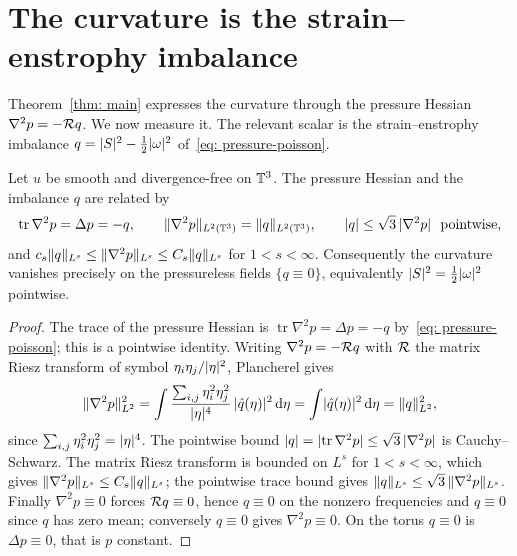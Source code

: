 \section{The curvature is the strain--enstrophy imbalance}
\label{sec: imbalance}

Theorem~\ref{thm: main} expresses the curvature through the pressure Hessian
$\nabla^2 p = -\mathcal{R} q$. We now measure it. The relevant scalar is the
strain--enstrophy imbalance $q = \lvert S \rvert^2 - \tfrac12\lvert \omega \rvert^2$
of~\eqref{eq: pressure-poisson}.

\begin{theorem}\label{thm: imbalance}
Let $u$ be smooth and divergence-free on
$\mathbb{T}^3$. The pressure Hessian and the imbalance $q$ are related by
\begin{equation}\label{eq: imbalance}
  \operatorname{tr}\nabla^2 p = \Delta p = -q,
  \qquad
  \lVert \nabla^2 p \rVert_{L^2(\mathbb{T}^3)} = \lVert q \rVert_{L^2(\mathbb{T}^3)},
  \qquad
  \lvert q \rvert \le \sqrt{3}\,\lvert \nabla^2 p \rvert\ \text{ pointwise},
\end{equation}
and $c_s\lVert q \rVert_{L^s} \le \lVert \nabla^2 p \rVert_{L^s} \le C_s\lVert q \rVert_{L^s}$ for
$1 < s < \infty$. Consequently the curvature vanishes precisely on the
pressureless fields $\{q \equiv 0\}$, equivalently
$\lvert S \rvert^2 = \tfrac12\lvert \omega \rvert^2$ pointwise.
\end{theorem}

\begin{proof}
The trace of the pressure Hessian is $\operatorname{tr}\nabla^2 p = \Delta p =
-q$ by~\eqref{eq: pressure-poisson}; this is a pointwise identity. Writing
$\nabla^2 p = -\mathcal{R} q$ with $\mathcal{R}$ the matrix Riesz transform of symbol
$\eta_i\eta_j/\lvert \eta \rvert^2$, Plancherel gives
\[
  \lVert \nabla^2 p \rVert_{L^2}^2
  = \int \frac{\sum_{i,j}\eta_i^2\eta_j^2}{\lvert \eta \rvert^4}\,\lvert \hat q(\eta) \rvert^2\,\mathrm{d}\eta
  = \int \lvert \hat q(\eta) \rvert^2\,\mathrm{d}\eta
  = \lVert q \rVert_{L^2}^2,
\]
since $\sum_{i,j}\eta_i^2\eta_j^2 = \lvert \eta \rvert^4$. The pointwise bound
$\lvert q \rvert = \lvert \operatorname{tr}\nabla^2 p \rvert \le \sqrt{3}\,\lvert \nabla^2 p \rvert$ is
Cauchy--Schwarz. The matrix Riesz transform is bounded on $L^s$ for
$1 < s < \infty$, which gives $\lVert \nabla^2 p \rVert_{L^s} \le C_s\lVert q \rVert_{L^s}$;
the pointwise trace bound gives $\lVert q \rVert_{L^s} \le \sqrt{3}\,\lVert \nabla^2 p \rVert_{L^s}$.
Finally $\nabla^2 p \equiv 0$ forces $\mathcal{R} q \equiv 0$, hence
$\hat q \equiv 0$ on the nonzero frequencies and $q \equiv 0$ since $q$ has zero
mean; conversely $q \equiv 0$ gives $\nabla^2 p \equiv 0$. On the torus
$q \equiv 0$ is $\Delta p \equiv 0$, that is $p$ constant.
\end{proof}

